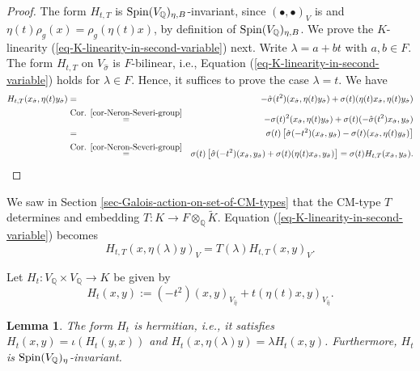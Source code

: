 \documentclass[12pt]{amsart}
\numberwithin{equation}{subsection}
\theoremstyle{plain}
\newtheorem{lem}[thm]{Lemma}
\theoremstyle{definition}
\newcommand{\QQ}{{\mathbb Q}}
\newcommand{\Spin}{{\rm Spin}}
\begin{document}
{{\begin{proof}
The form $H_{t,T}$ is $\Spin(V_\QQ)_{\eta,B}$-invariant, since $(\bullet,\bullet)_V$ is and $\eta(t)\rho_g(x)=\rho_g(\eta(t)x)$, by definition of $\Spin(V_\QQ)_{\eta,B}$.
We prove the $K$-linearity (\ref{eq-K-linearity-in-second-variable}) next.
Write $\lambda=a+bt$ with $a, b\in F$. The form $H_{t,T}$ on $V_{\hat{\sigma}}$ is $F$-bilinear, i.e., Equation (\ref{eq-K-linearity-in-second-variable}) holds for $\lambda\in F$. Hence, it suffices to prove the case $\lambda=t$. We have
\begin{eqnarray*}
H_{t,T}(x_{\hat{\sigma}},\eta(t)y_{\hat{\sigma}})&=&-\hat{\sigma}(t^2)(x_{\hat{\sigma}},\eta(t)y_{\hat{\sigma}})+
\sigma(t)(\eta(t)x_{\hat{\sigma}},\eta(t)y_{\hat{\sigma}})
\\
&\stackrel{\mbox{Cor. \ref{cor-Neron-Severi-group}}}{=}&
-\sigma(t)^2(x_{\hat{\sigma}},\eta(t)y_{\hat{\sigma}})+\sigma(t)(-\hat{\sigma}(t^2)x_{\hat{\sigma}},y_{\hat{\sigma}})
\\
&=&\sigma(t)\left[
\hat{\sigma}(-t^2)(x_{\hat{\sigma}},y_{\hat{\sigma}})-\sigma(t)(x_{\hat{\sigma}},\eta(t)y_{\hat{\sigma}})
\right]
\\
&\stackrel{\mbox{Cor. \ref{cor-Neron-Severi-group}}}{=}& \sigma(t)\left[
\hat{\sigma}(-t^2)(x_{\hat{\sigma}},y_{\hat{\sigma}})+\sigma(t)(\eta(t)x_{\hat{\sigma}},y_{\hat{\sigma}})
\right]
=\sigma(t)H_{t,T}(x_{\hat{\sigma}},y_{\hat{\sigma}}).
\end{eqnarray*}
\end{proof}


We saw in Section \ref{sec-Galois-action-on-set-of-CM-types} that the CM-type $T$ determines and embedding $T:K\rightarrow F\otimes_\QQ\tilde{K}$.
Equation (\ref{eq-K-linearity-in-second-variable}) becomes
\[
H_{t,T}(x,\eta(\lambda)y)_V=T(\lambda)H_{t,T}(x,y)_V.
\]
}

Let $H_t:V_\QQ\times V_\QQ\rightarrow K$ be given by
\begin{equation}
\label{eq-H-t}
H_t(x,y) :=
(-t^2)(x,y)_{V_{\hat{\eta}}}+t(\eta(t)x,y)_{V_{\hat{\eta}}}.
\end{equation}

\begin{lem}
\label{lemma-H-t-is-hermitian}
The form $H_t$ is hermitian, i.e., it satisfies $H_t(x,y)=\iota(H_t(y,x))$ and $H_t(x,\eta(\lambda)y)=\lambda H_t(x,y)$. Furthermore, $H_t$ is $\Spin(V_\QQ)_\eta$-invariant.
\end{lem}

}
\end{document}

